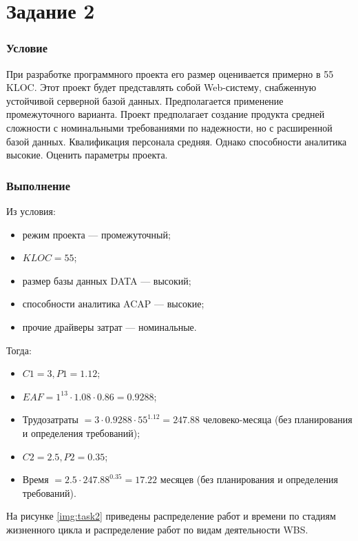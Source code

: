 \section*{Задание 2}

\subsubsection*{Условие}

При разработке программного проекта его размер оценивается примерно в 55 KLOC. Этот проект будет представлять собой Web-систему, снабженную устойчивой серверной базой данных. Предполагается применение промежуточного варианта. Проект предполагает создание продукта средней сложности с номинальными требованиями по надежности, но с расширенной базой данных. Квалификация персонала средняя. Однако способности аналитика высокие. Оценить параметры проекта.

\subsubsection*{Выполнение}

Из условия:

\begin{itemize}
	\item режим проекта --- промежуточный;
	\item $KLOC = 55$;
	\item размер базы данных DATA --- высокий;
	\item способности аналитика ACAP --- высокие;
	\item прочие драйверы затрат --- номинальные.
\end{itemize}

Тогда:

\begin{itemize}
	\item $C1 = 3, P1 = 1.12$;
	\item $EAF = 1^{13} \cdot 1.08 \cdot 0.86 = 0.9288$;
	\item $\text{Трудозатраты } = 3 \cdot 0.9288 \cdot 55^{1.12} = 247.88 \text{ человеко-месяца}$ (без планирования и определения требований);
	\item $C2 = 2.5, P2 = 0.35$;
	\item $\text{Время } = 2.5 \cdot 247.88^{0.35} = 17.22 \text{ месяцев}$  (без планирования и определения требований).
\end{itemize}

На рисунке \ref{img:task2} приведены распределение работ и времени по стадиям жизненного цикла и распределение работ по видам деятельности WBS.

